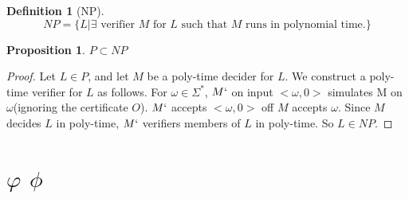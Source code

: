 \documentclass{article}
\theoremstyle{definition}
\newtheorem{define}{Definition}[section]
\newtheorem{prop}{Proposition}[section]
\begin{document}
\begin{define}[NP]
$$NP = \{L|\exists \text{ verifier } M \text{ for } L \text{ such that } M \text{ runs in polynomial time.}\}$$
\end{define}

\begin{prop}
$P\subset NP$
\end{prop}
\begin{proof}
Let $L\in P$, and let $M$ be a poly-time decider for $L$. We construct a poly-time verifier for $L$ as follows. For $\omega \in \Sigma^*$, $M`$ on input $<\omega,0>$ simulates M on $\omega$(ignoring the certificate $O$). $M`$ accepts $<\omega, 0>$ off $M$ accepts $\omega$. Since $M$ decides $L$ in poly-time, $M`$ verifiers members of $L$ in poly-time. So $L \in NP$.
\end{proof}

\section{$\varphi$   $\phi$}
\end{document}

